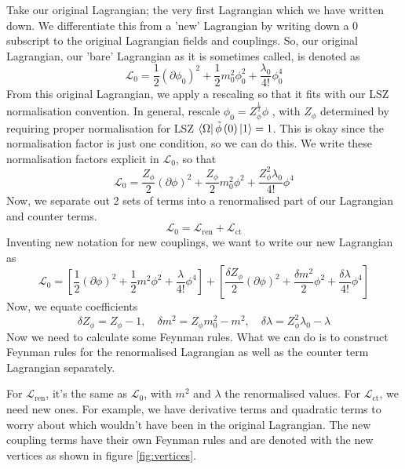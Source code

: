 \documentclass[11pt, oneside]{article}   	%
\theoremstyle{slanted}
\begin{document}
Take our original Lagrangian; the 
very first Lagrangian which we have written down. We differentiate 
this from a 'new' Lagrangian by writing down 
a 0 subscript
to the original Lagrangian 
fields and couplings. So, our original Lagrangian, our 'bare' Lagrangian
as it is sometimes called, is denoted as 
\[
\mathcal{ L } _ 0  = \frac{1}{2 } \left( \partial  \phi _ 0  \right)  ^ 2 
+ \frac{1}{2 } m_0^ 2 \phi _ 0 ^ 2 + \frac{\lambda _ 0 }{ 4 ! } \phi _ 0 ^  4  
\] From this original Lagrangian, we apply a rescaling 
so that it fits with our LSZ normalisation convention. 
In general, rescale $ \phi _ 0  = Z _{ \phi } ^{ \frac{1}{2 } } \phi  $ , 
with $  Z_ \phi  $  determined 
by requiring proper normalisation for 
LSZ $ \bra{ \Omega } \tilde{ \phi } \left( 0  \right)  \ket{ 1 }   = 1 $. 
This is okay since the normalisation factor 
is just one condition, so we can do this. 
We write these normalisation factors explicit in $ \mathcal{ L }_ 0  $, 
so that 
\[
\mathcal{ L }_ 0 = \frac{Z_ \phi }{ 2 } \left( \partial  \phi  \right)  ^ 2 
+ \frac{ Z _ \phi }{ 2 }m_0^ 2 \phi ^ 2 + \frac{Z _ \phi ^ 2 \lambda _ 0 }{ 4 ! } \phi ^ 4
\] Now, we separate out 
2 sets of terms into a renormalised 
part of our Lagrangian and counter terms. 
\[
\mathcal{ L }_ 0  = \mathcal{ L }_{\text{ren}} + \mathcal{ L } _{ \text{ct}}
\] Inventing new 
notation for new couplings, we want to write our 
new Lagrangian as 
\[
\mathcal{ L } _ 0  = 
\left[  \frac{1}{2 } \left( \partial  \phi  \right)  ^ 2 
+ \frac{1}{2 } m ^ 2 \phi ^ 2 + \frac{\lambda }{ 4 ! } \phi ^ 4 \right]  
+ \left[  \frac{\delta Z _ \phi }{ 2  } \left( \partial  
\phi \right)  ^ 2 + \frac{ \delta m ^ 2  }{ 2 } \phi ^ 2 + \frac{\delta \lambda }{ 4 ! } 
\phi ^ 4 \right] 
\] Now, we equate coefficients 
\[
\delta Z _ \phi  = Z _ \phi  - 1, \quad \delta m ^ 2  = Z _ \phi m_0 ^ 2  - m ^ 2 , 
\quad \delta \lambda  = Z _ \phi ^ 2 \lambda _ 0  - \lambda 
\] Now we need to calculate some Feynman rules. 
What we can do is to construct Feynman rules 
for the renormalised Lagrangian as well as the counter term 
Lagrangian separately. 

For $ \mathcal{ L } _{\text{ren}}$, it's the same as $ \mathcal{ L } _ 0 $, 
with $ m ^ 2 $ and $ \lambda  $ the renormalised values. 
For $ \mathcal{ L } _{\text{ct} } $, we need new ones. 
For example, we have derivative terms 
and quadratic terms to worry about which 
wouldn't have been in the original Lagrangian. 
The new coupling 
terms have their own Feynman rules and are denoted with the new vertices as shown 
in figure \ref{fig:vertices}. 
\end{document}
